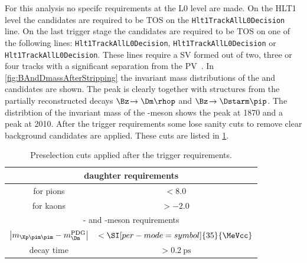 For this analysis no specifc requirements at the L0 level are made.
On the HLT1 level the \Bz candidates are required to be TOS on the \verb!Hlt1TrackAllL0Decision! line.
On the last trigger stage the \BdToDpi candidates are required to be TOS on one of the following lines: \verb!Hlt1TrackAllL0Decision!, \verb!Hlt1TrackAllL0Decision! or \verb!Hlt1TrackAllL0Decision!.
These lines require a \ac{SV} formed out of two, three or four tracks with a significant separation from the \ac{PV}~\cite{Trigger_Gligorov}.
In \cref{fig:BAndDmassAfterStripping} the invariant mass distributions of the \Bz and \Dm candidates are shown. The \Bz peak is clearly together with structures from the partially reconstructed decays $\Bz\!\to\Dm\rhop$ and $\Bz\!\to\Dstarm\pip$.
The distribtion of the invariant mass of the \D-meson shows the \Dm peak at \SI[per-mode=symbol]{1870}{\MeVcc} and a \Dstarm peak at \SI[per-mode=symbol]{2010}{\MeVcc}.
After the trigger requirements some lose sanity cuts to remove clear background candidates are applied.
These cuts are listed in \cref{tab:preselection}.
\begin{table}[tbp]
	\centering
	\caption{Preselection cuts applied after the trigger requirements.}
	\begin{tabular}{cc}
		\toprule
		\multicolumn{2}{c}{\Dm daughter requirements}\\
		\midrule
		\dllkpi for pions	& $<8.0$ \\
		\dllkpi for kaons 	& $>-2.0$ \\
		\midrule
		\multicolumn{2}{c}{\Dm- and \Bz-meson requirements}\\
		\midrule
		$\left|m_{\Kp\pim\pim}-m_\Dm^{\text{PDG}}\right|$	& $<\SI[per-mode=symbol]{35}{\MeVcc}$ \\
		\Bz decay time										& $>\SI{0.2}{\pico\second}$ \\
		\bottomrule
	\end{tabular}
	\label{tab:preselection}
\end{table}
